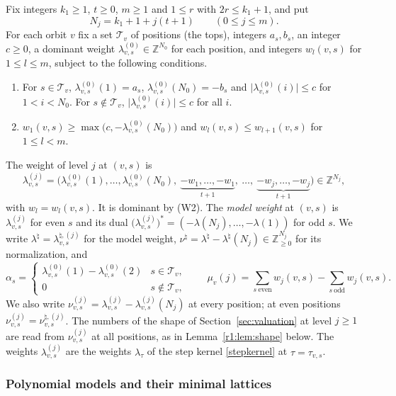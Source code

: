 Fix integers $k_1\ge1$, $t\ge0$, $m\ge1$ and $1\le r$ with $2r\le k_1+1$, and put
\[
N_j=k_1+1+j(t+1)\qquad(0\le j\le m).
\]
For each orbit $v$ fix a set $\mathcal T_v$ of positions (the tops), integers $a_s,b_s$, an integer $c\ge0$, a dominant weight $\lambda^{(0)}_{v,s}\in\mathbb Z^{N_0}$ for each position, and integers $w_l(v,s)$ for $1\le l\le m$, subject to the following conditions.
\begin{enumerate}
\item[(W1)] For $s\in\mathcal T_v$, $\lambda^{(0)}_{v,s}(1)=a_s$, $\lambda^{(0)}_{v,s}(N_0)=-b_s$ and $\lvert\lambda^{(0)}_{v,s}(i)\rvert\le c$ for $1<i<N_0$. For $s\notin\mathcal T_v$, $\lvert\lambda^{(0)}_{v,s}(i)\rvert\le c$ for all $i$.
\item[(W2)] $w_1(v,s)\ge\max\big(c,-\lambda^{(0)}_{v,s}(N_0)\big)$ and $w_l(v,s)\le w_{l+1}(v,s)$ for $1\le l<m$.
\end{enumerate}
The weight of level $j$ at $(v,s)$ is
\[
\lambda^{(j)}_{v,s}=\big(\lambda^{(0)}_{v,s}(1),\dots,\lambda^{(0)}_{v,s}(N_0),\ \underbrace{-w_1,\dots,-w_1}_{t+1},\ \dots,\ \underbrace{-w_j,\dots,-w_j}_{t+1}\big)\in\mathbb Z^{N_j},
\]
with $w_l=w_l(v,s)$. It is dominant by (W2). The \emph{model weight} at $(v,s)$ is $\lambda^{(j)}_{v,s}$ for even $s$ and its dual $\big(\lambda^{(j)}_{v,s}\big)^{\ast}=(-\lambda(N_j),\dots,-\lambda(1))$ for odd $s$. We write $\lambda^{\natural}=\lambda^{\natural,(j)}_{v,s}$ for the model weight, $\nu^{\natural}=\lambda^{\natural}-\lambda^{\natural}(N_j)\in\mathbb Z_{\ge0}^{N_j}$ for its normalization, and
\begin{equation}\label{r1:eq:numbers}
\alpha_s=\begin{cases}\lambda^{(0)}_{v,s}(1)-\lambda^{(0)}_{v,s}(2)&s\in\mathcal T_v,\\0&s\notin\mathcal T_v,\end{cases}\qquad
\mu_v(j)=\sum_{s\ \mathrm{even}}w_j(v,s)-\sum_{s\ \mathrm{odd}}w_j(v,s).
\end{equation}
We also write $\nu^{(j)}_{v,s}=\lambda^{(j)}_{v,s}-\lambda^{(j)}_{v,s}(N_j)$ at every position; at even positions $\nu^{(j)}_{v,s}=\nu^{\natural,(j)}_{v,s}$. The numbers of the shape of Section~\ref{sec:valuation} at level $j\ge1$ are read from $\nu^{(j)}_{v,s}$ at all positions, as in Lemma~\ref{r1:lem:shape} below. The weights $\lambda^{(j)}_{v,s}$ are the weights $\lambda_\tau$ of the step kernel \eqref{stepkernel} at $\tau=\tau_{v,s}$.

\subsubsection{Polynomial models and their minimal lattices}

